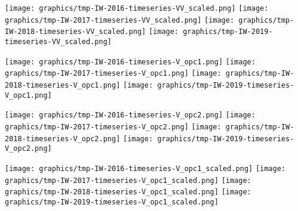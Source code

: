 \clearpage
\begin{center}
\begin{minipage}{7.0in}
\texttt{[image: graphics/tmp-IW-2016-timeseries-VV\_scaled.png]}
\quad
\texttt{[image: graphics/tmp-IW-2017-timeseries-VV\_scaled.png]}
\vskip 1.0cm
\texttt{[image: graphics/tmp-IW-2018-timeseries-VV\_scaled.png]}
\quad
\texttt{[image: graphics/tmp-IW-2019-timeseries-VV\_scaled.png]}
\end{minipage}
\end{center}


\clearpage
\begin{center}
\begin{minipage}{7.0in}
\texttt{[image: graphics/tmp-IW-2016-timeseries-V\_opc1.png]}
\quad
\texttt{[image: graphics/tmp-IW-2017-timeseries-V\_opc1.png]}
\vskip 1.0cm
\texttt{[image: graphics/tmp-IW-2018-timeseries-V\_opc1.png]}
\quad
\texttt{[image: graphics/tmp-IW-2019-timeseries-V\_opc1.png]}
\end{minipage}
\end{center}


\clearpage
\begin{center}
\begin{minipage}{7.0in}
\texttt{[image: graphics/tmp-IW-2016-timeseries-V\_opc2.png]}
\quad
\texttt{[image: graphics/tmp-IW-2017-timeseries-V\_opc2.png]}
\vskip 1.0cm
\texttt{[image: graphics/tmp-IW-2018-timeseries-V\_opc2.png]}
\quad
\texttt{[image: graphics/tmp-IW-2019-timeseries-V\_opc2.png]}
\end{minipage}
\end{center}


\clearpage
\begin{center}
\begin{minipage}{7.0in}
\texttt{[image: graphics/tmp-IW-2016-timeseries-V\_opc1\_scaled.png]}
\quad
\texttt{[image: graphics/tmp-IW-2017-timeseries-V\_opc1\_scaled.png]}
\vskip 1.0cm
\texttt{[image: graphics/tmp-IW-2018-timeseries-V\_opc1\_scaled.png]}
\quad
\texttt{[image: graphics/tmp-IW-2019-timeseries-V\_opc1\_scaled.png]}
\end{minipage}
\end{center}


